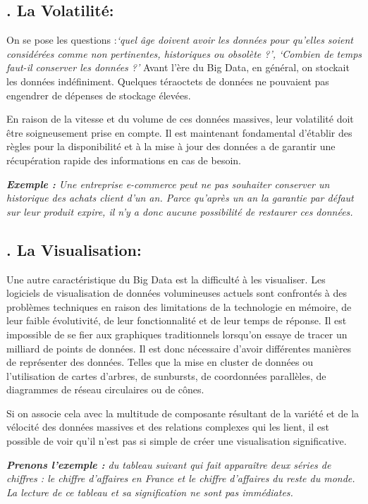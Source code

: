 \subsection*{. La Volatilité:}
On se pose les questions :\textit{‘quel âge doivent avoir les données pour qu'elles soient considérées comme non pertinentes, historiques ou obsolète ?’,  ‘Combien de temps faut-il conserver les données ?’} Avant l'ère du Big Data, en général, on stockait les données indéfiniment. Quelques téraoctets de données ne pouvaient pas engendrer de dépenses de stockage élevées. 

En raison de la vitesse et du volume de ces données massives, leur volatilité doit être soigneusement prise en compte. Il est maintenant fondamental d'établir des règles pour la disponibilité et à la mise à jour des données a de garantir une récupération rapide des informations en cas de besoin.

\textit{\textbf{Exemple :} Une entreprise e-commerce peut ne pas souhaiter conserver un historique des achats client d'un an. Parce qu'après un an la garantie par défaut sur leur produit expire, il n'y a donc aucune possibilité de restaurer ces données.}

\subsection*{. La Visualisation:}
Une autre caractéristique du Big Data est la difficulté à les visualiser. Les logiciels de visualisation de données volumineuses actuels sont confrontés à des problèmes techniques en raison des limitations de la technologie en mémoire, de leur faible évolutivité, de leur fonctionnalité et de leur temps de réponse. Il est impossible de se fier aux graphiques traditionnels lorsqu'on essaye de tracer un milliard de points de données. Il est donc nécessaire d'avoir différentes manières de représenter des données. Telles que la mise en cluster de données ou l'utilisation de cartes d'arbres, de sunbursts, de coordonnées parallèles, de diagrammes de réseau circulaires ou de cônes. 

Si on associe cela avec la multitude de composante résultant de la variété et de la vélocité des données massives et des relations complexes qui les lient, il est possible de voir qu'il n'est pas si simple de créer une visualisation significative.

\textit{\textbf{Prenons l'exemple :} du tableau suivant qui fait apparaître deux séries de chiffres : le chiffre d'affaires en France et le chiffre d'affaires du reste du monde. La lecture de ce tableau et sa signification ne sont pas immédiates.}

